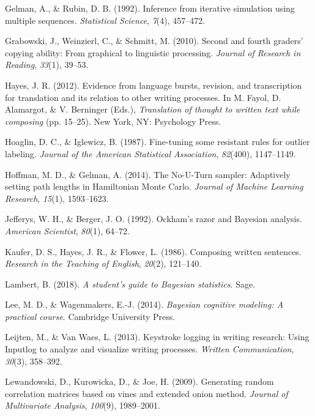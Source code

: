 \documentclass[english,man,floatsintext]{apa7}
\begin{document}
\leavevmode\hypertarget{ref-gelman1992}{}%
Gelman, A., \& Rubin, D. B. (1992). Inference from iterative simulation using multiple sequences. \emph{Statistical Science}, \emph{7}(4), 457--472.

\leavevmode\hypertarget{ref-grabowski2010second}{}%
Grabowski, J., Weinzierl, C., \& Schmitt, M. (2010). Second and fourth graders' copying ability: From graphical to linguistic processing. \emph{Journal of Research in Reading}, \emph{33}(1), 39--53.

\leavevmode\hypertarget{ref-hayes2012evidence}{}%
Hayes, J. R. (2012). Evidence from language bursts, revision, and transcription for translation and its relation to other writing processes. In M. Fayol, D. Alamargot, \& V. Berninger (Eds.), \emph{Translation of thought to written text while composing} (pp. 15--25). New York, NY: Psychology Press.

\leavevmode\hypertarget{ref-hoaglin1987fine}{}%
Hoaglin, D. C., \& Iglewicz, B. (1987). Fine-tuning some resistant rules for outlier labeling. \emph{Journal of the American Statistical Association}, \emph{82}(400), 1147--1149.

\leavevmode\hypertarget{ref-hoffman2014no}{}%
Hoffman, M. D., \& Gelman, A. (2014). The No-U-Turn sampler: Adaptively setting path lengths in Hamiltonian Monte Carlo. \emph{Journal of Machine Learning Research}, \emph{15}(1), 1593--1623.

\leavevmode\hypertarget{ref-jefferys1992ockham}{}%
Jefferys, W. H., \& Berger, J. O. (1992). Ockham's razor and Bayesian analysis. \emph{American Scientist}, \emph{80}(1), 64--72.

\leavevmode\hypertarget{ref-kaufer1986composing}{}%
Kaufer, D. S., Hayes, J. R., \& Flower, L. (1986). Composing written sentences. \emph{Research in the Teaching of English}, \emph{20}(2), 121--140.

\leavevmode\hypertarget{ref-lambert2018student}{}%
Lambert, B. (2018). \emph{A student's guide to Bayesian statistics}. Sage.

\leavevmode\hypertarget{ref-lee2014bayesian}{}%
Lee, M. D., \& Wagenmakers, E.-J. (2014). \emph{Bayesian cognitive modeling: A practical course}. Cambridge University Press.

\leavevmode\hypertarget{ref-leijten2013keystroke}{}%
Leijten, M., \& Van Waes, L. (2013). Keystroke logging in writing research: Using Inputlog to analyze and visualize writing processes. \emph{Written Communication}, \emph{30}(3), 358--392.

\leavevmode\hypertarget{ref-lewandowski2009generating}{}%
Lewandowski, D., Kurowicka, D., \& Joe, H. (2009). Generating random correlation matrices based on vines and extended onion method. \emph{Journal of Multivariate Analysis}, \emph{100}(9), 1989--2001.
\end{document}
